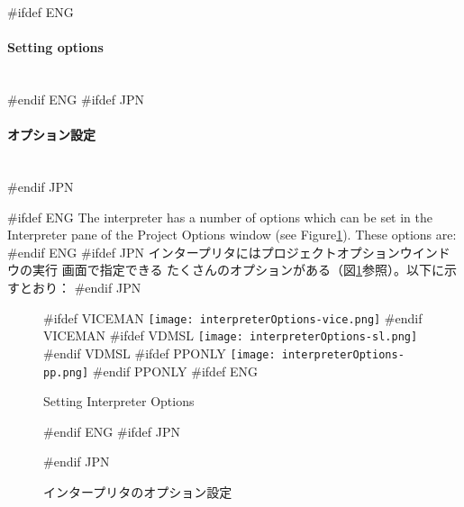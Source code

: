 \documentclass[\pformat,12pt]{article}
\newcommand{\subsubsubsection}[1]{\paragraph{#1}\mbox{}\\}
\newcommand{\guicmd}[1]{{\sf #1}}
\newcommand{\guicmd}[1]{{\gt #1}}
\begin{document}
#ifdef ENG
\subsubsubsection{Setting options}
#endif ENG
#ifdef JPN
\subsubsubsection{オプション設定}
#endif JPN


#ifdef ENG
The interpreter has a number of options which can be set in the 
\guicmd{Interpreter} pane of the \guicmd{Project Options} window (see
Figure\ref{fig:optint}). These options are:
#endif ENG
#ifdef JPN
インタープリタには\guicmd{プロジェクトオプション}ウインドウの\guicmd{実行} 画面で指定できる
たくさんのオプションがある（図\ref{fig:optint}参照）。以下に示すとおり：
#endif JPN

\begin{figure}[tbh]
\begin{center}
#ifdef VICEMAN
\texttt{[image: interpreterOptions-vice.png]}
#endif VICEMAN
#ifdef VDMSL
\texttt{[image: interpreterOptions-sl.png]}
#endif VDMSL
#ifdef PPONLY
\texttt{[image: interpreterOptions-pp.png]}
#endif PPONLY
#ifdef ENG
\caption{Setting Interpreter Options}
#endif ENG
#ifdef JPN
\caption{インタープリタのオプション設定}
#endif JPN
\label{fig:optint}
\end{center}
\end{figure}
\end{document}
